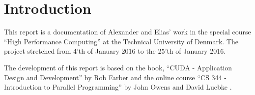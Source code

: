 \chapter{Introduction}
\label{chap:introduction}

This report is a documentation of Alexander and Elias' work in the special course ``High Performance Computing'' at the Technical University of Denmark.
The project stretched from 4'th of January 2016 to the 25'th of January 2016.

The development of this report is based on the book, ``CUDA - Application Design and Development'' by Rob Farber \cite{farber2011cuda} and the online course ``CS 344 - Introduction to Parallel Programming'' by John Owens and David Luebke \cite{udacity}.




